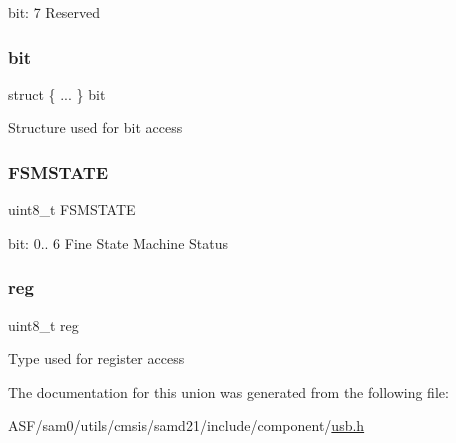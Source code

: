 bit\+: 7 Reserved \mbox{\label{union_u_s_b___f_s_m_s_t_a_t_u_s___type_a4977bb0068087305ad7a5d58497a6138}} 
\subsubsection{\texorpdfstring{bit}{bit}}
{\footnotesize\ttfamily struct \{ ... \}   bit}

Structure used for bit access \mbox{\label{union_u_s_b___f_s_m_s_t_a_t_u_s___type_a9132a0e973699d58e0fde3995c79324f}} 
\subsubsection{\texorpdfstring{FSMSTATE}{FSMSTATE}}
{\footnotesize\ttfamily uint8\+\_\+t F\+S\+M\+S\+T\+A\+TE}

bit\+: 0.. 6 Fine State Machine Status \mbox{\label{union_u_s_b___f_s_m_s_t_a_t_u_s___type_a9428adc9af4653a2050e2536b55dec8d}} 
\subsubsection{\texorpdfstring{reg}{reg}}
{\footnotesize\ttfamily uint8\+\_\+t reg}

Type used for register access 

The documentation for this union was generated from the following file\+:\begin{DoxyCompactItemize}
\item 
A\+S\+F/sam0/utils/cmsis/samd21/include/component/\mbox{\hyperlink{component_2usb_8h}{usb.\+h}}\end{DoxyCompactItemize}
